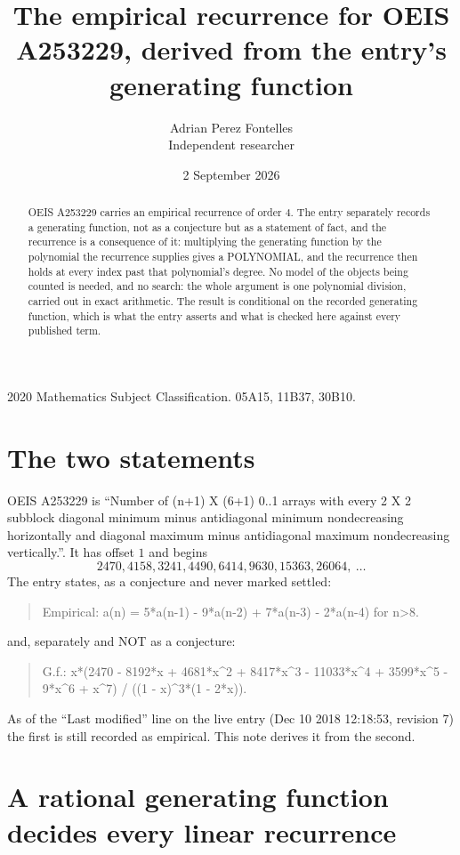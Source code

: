 \documentclass[11pt,a4paper]{article}
\title{The empirical recurrence for OEIS A253229, derived from the entry's generating function}
\author{Adrian Perez Fontelles\\ \small Independent researcher}
\date{2 September 2026}
\theoremstyle{plain}
\theoremstyle{definition}
\begin{document}
\maketitle

\begin{abstract}
OEIS A253229 carries an empirical recurrence of order $4$. The entry separately records a
generating function, not as a conjecture but as a statement of fact, and the recurrence is a
consequence of it: multiplying the generating function by the polynomial the recurrence
supplies gives a POLYNOMIAL, and the recurrence then holds at every index past that
polynomial's degree. No model of the objects being counted is needed, and no search: the
whole argument is one polynomial division, carried out in exact arithmetic. The result is
conditional on the recorded generating function, which is what the entry asserts and what is
checked here against every published term.
\end{abstract}

\noindent\small 2020 Mathematics Subject Classification. 05A15, 11B37, 30B10.\normalsize

\section{The two statements}

OEIS A253229 is ``Number of (n+1) X (6+1) 0..1 arrays with every 2 X 2 subblock diagonal minimum minus antidiagonal minimum nondecreasing horizontally and diagonal maximum minus antidiagonal maximum nondecreasing vertically.''. It has offset $1$ and begins
\[
2470, 4158, 3241, 4490, 6414, 9630, 15363, 26064,\ \dots
\]
The entry states, as a conjecture and never marked settled:
\begin{quote}
Empirical: a(n) = 5*a(n-1) - 9*a(n-2) + 7*a(n-3) - 2*a(n-4) for n>8.
\end{quote}
and, separately and NOT as a conjecture:
\begin{quote}
G.f.: x*(2470 - 8192*x + 4681*x\^{}2 + 8417*x\^{}3 - 11033*x\^{}4 + 3599*x\^{}5 - 9*x\^{}6 + x\^{}7) / ((1 - x)\^{}3*(1 - 2*x)).
\end{quote}
As of the ``Last modified'' line on the live entry (Dec 10 2018 12:18:53, revision 7) the first is still
recorded as empirical. This note derives it from the second.

\section{A rational generating function decides every linear recurrence}
\end{document}
